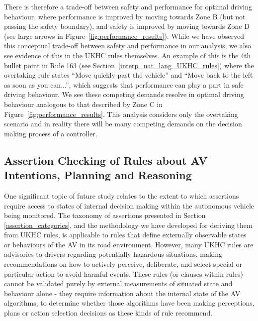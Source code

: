 There is therefore a trade-off between safety and performance for optimal driving behaviour, where performance is improved by moving towards Zone B (but not passing the safety boundary), and safety is improved by moving towards Zone D (see large arrows in Figure~\ref{fig:performance_results}). While we have observed this conceptual trade-off between safety and performance in our analysis, we also see evidence of this in the UKHC rules themselves. An example of this is the 4th bullet point in Rule 163 (see Section~\ref{interp_nat_lang_UKHC_rules}) where the overtaking rule states ``Move quickly past the vehicle'' and ``Move back to the left as soon as you can...'', which suggests that performance can play a part in safe driving behaviour. 
%
We see these competing demands resolve in optimal driving behaviour analogous to that described by Zone C in Figure~\ref{fig:performance_results}. This analysis considers only the overtaking scenario and in reality there will be many competing demands on the decision making process of a controller. 





\subsection{Assertion Checking of Rules about AV Intentions, Planning and Reasoning}


One significant topic of future study relates to the extent to which assertions require access to states of internal decision making within the autonomous vehicle being monitored. The taxonomy of assertions presented in Section \ref{assertion_categories}, and the methodology we have developed for deriving them from UKHC rules, is applicable to rules that define externally observable states or behaviours of the AV in its road environment. However, many UKHC rules are advisories to drivers %
regarding potentially hazardous situations, making recommendations on how to actively perceive, deliberate, and select special or particular action to avoid harmful events. These rules (or clauses within rules) cannot be validated purely by external measurements of situated state and behaviour alone - they require information about the internal state of the AV algorithms, to determine whether those algorithms have been making perceptions, plans or action selection decisions as these kinds of rule recommend.

